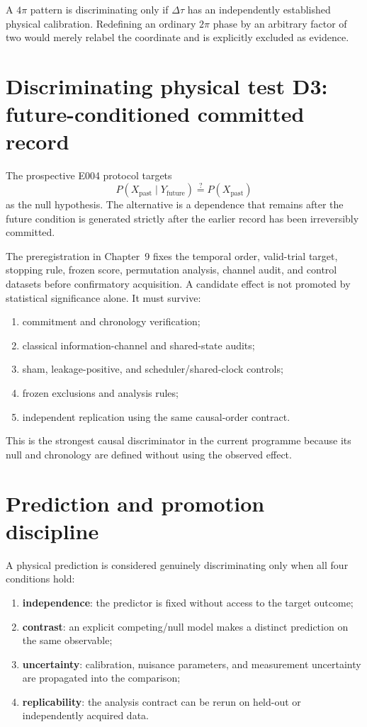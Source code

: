A \(4\pi\) pattern is discriminating only if \(\Delta\tau\) has an independently established physical calibration. Redefining an ordinary \(2\pi\) phase by an arbitrary factor of two would merely relabel the coordinate and is explicitly excluded as evidence.

\section{Discriminating physical test D3: future-conditioned committed record}

The prospective E004 protocol targets
\[
\boxed{
P(X_{\mathrm{past}}\mid Y_{\mathrm{future}})
\stackrel{?}{=}
P(X_{\mathrm{past}})
}
\]
as the null hypothesis. The alternative is a dependence that remains after the future condition is generated strictly after the earlier record has been irreversibly committed.

The preregistration in Chapter~9 fixes the temporal order, valid-trial target, stopping rule, frozen score, permutation analysis, channel audit, and control datasets before confirmatory acquisition. A candidate effect is not promoted by statistical significance alone. It must survive:
\begin{enumerate}
\item commitment and chronology verification;
\item classical information-channel and shared-state audits;
\item sham, leakage-positive, and scheduler/shared-clock controls;
\item frozen exclusions and analysis rules;
\item independent replication using the same causal-order contract.
\end{enumerate}
This is the strongest causal discriminator in the current programme because its null and chronology are defined without using the observed effect.

\section{Prediction and promotion discipline}

A physical prediction is considered genuinely discriminating only when all four conditions hold:
\begin{enumerate}
\item \textbf{independence}: the predictor is fixed without access to the target outcome;
\item \textbf{contrast}: an explicit competing/null model makes a distinct prediction on the same observable;
\item \textbf{uncertainty}: calibration, nuisance parameters, and measurement uncertainty are propagated into the comparison;
\item \textbf{replicability}: the analysis contract can be rerun on held-out or independently acquired data.
\end{enumerate}

